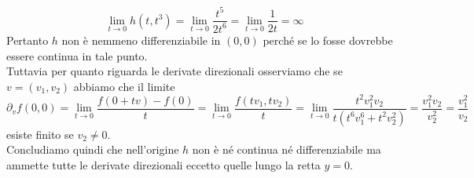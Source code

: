 \begin{itemize}
  \begin{equation*}
    \lim_{t \to 0} h(t, t^3) = \lim_{t \to 0} \frac{t^5}{2t^6} = \lim_{t \to 0} \frac{1}{2t} = \infty
  \end{equation*}
  Pertanto $ h $ non è nemmeno differenziabile in $ (0, 0) $ perché se lo fosse dovrebbe essere continua in tale punto. \\
  Tuttavia per quanto riguarda le derivate direzionali osserviamo che se $ v = (v_1, v_2) $ abbiamo che il limite
  \begin{equation*}
    \partial_v f(0, 0) = \lim_{t \to 0} \frac{f(0 + tv) - f(0)}{t} = \lim_{t \to 0} \frac{f(tv_1, tv_2)}{t} = \lim_{t \to 0} \frac{t^2 v_1^2 v_2}{t(t^6 v_1^6 + t^2 v_2^2)} = \frac{v_1^2 v_2}{v_2^2} = \frac{v_1^2}{v_2}
  \end{equation*}
  esiste finito se $ v_2 \neq 0 $. \\
  Concludiamo quindi che nell'origine $ h $ non è né continua né differenziabile ma ammette tutte le derivate direzionali eccetto quelle lungo la retta $ y = 0 $.
\end{itemize}